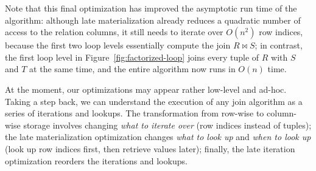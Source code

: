 Note that this final optimization has improved the asymptotic
run time of the algorithm:
although late materialization already reduces a quadratic
number of access to the relation columns,
it still needs to iterate over $O(n^2)$ row indices,
because the first two loop levels essentially compute
the join $R \bowtie S$;
in contrast, the first loop level in Figure~\ref{fig:factorized-loop}
joins every tuple of $R$ with $S$ and $T$ at the same time,
and the entire algorithm now runs in $O(n)$ time.

At the moment, our optimizations may appear rather low-level and ad-hoc.
Taking a step back, we can understand the execution of
any join algorithm as a series of iterations and lookups.
The transformation from row-wise to column-wise storage
involves changing {\em what to iterate over} (row indices instead of tuples);
the late materialization optimization changes {\em what to look up}
and {\em when to look up} (look up row indices first, then retrieve values later);
finally, the late iteration optimization reorders the iterations and lookups.

